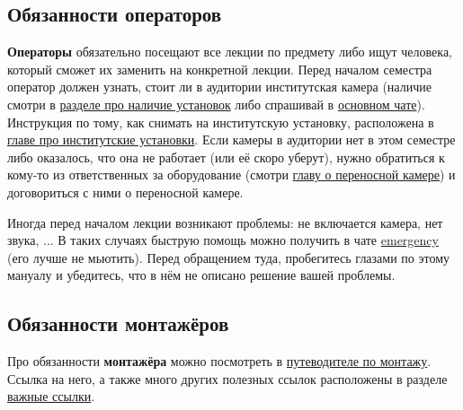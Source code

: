 \subsection{Обязанности операторов}

\textbf{Операторы} обязательно посещают все лекции по предмету либо ищут человека, который сможет их заменить на конкретной лекции. Перед началом семестра оператор должен узнать, стоит ли в аудитории институтская камера (наличие смотри в \hyperref[ssec:equipment-availability]{разделе про наличие установок} либо спрашивай в \hyperlink{main-chat-vk}{основном чате}). Инструкция по тому, как снимать на институтскую установку, расположена в \hyperref[sec:institution-camera]{главе про институтские установки}. Если камеры в аудитории нет в этом семестре либо оказалось, что она не работает (или её скоро уберут), нужно обратиться к кому-то из ответственных за оборудование (смотри \hyperref[sec:portable-camera]{главу о переносной камере}) и договориться с ними о переносной камере.

Иногда перед началом лекции возникают проблемы: не включается камера, нет звука, ... В таких случаях быструю помощь можно получить в чате \hyperlink{emergency-chat-vk}{emergency} (его лучше не мьютить). Перед обращением туда, пробегитесь глазами по этому мануалу и убедитесь, что в нём не описано решение вашей проблемы.

\subsection{Обязанности монтажёров}

Про обязанности \textbf{монтажёра} можно посмотреть в \hyperlink{montage-guide}{путеводителе по монтажу}. Ссылка на него, а также много других полезных ссылок расположены в разделе \hyperref[ssec:important-links]{важные ссылки}.
